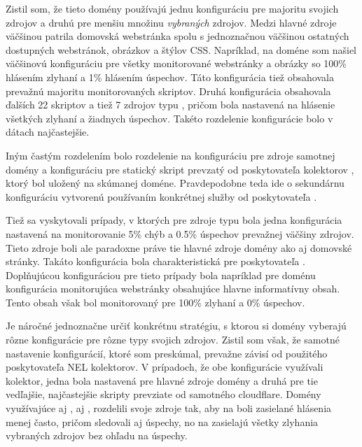 Zistil som, že tieto domény používajú jednu konfiguráciu pre majoritu svojich zdrojov a druhú pre menšiu množinu \textit{vybraných} zdrojov.
Medzi hlavné zdroje väčšinou patrila domovská webstránka spolu s jednoznačnou väčšinou ostatných dostupných webstránok, obrázkov a štýlov CSS.
Napríklad, na doméne  som našiel väčšinovú konfiguráciu pre všetky monitorované webstránky a obrázky so 100\% hlásením zlyhaní a 1\% hlásením úspechov. 
Táto konfigurácia tiež obsahovala prevažnú majoritu monitorovaných skriptov.
Druhá konfigurácia obsahovala ďalších 22 skriptov a tiež 7 zdrojov typu ,
pričom bola nastavená na hlásenie všetkých zlyhaní a žiadnych úspechov.
Takéto rozdelenie konfigurácie bolo v dátach najčastejšie.

Iným častým rozdelením bolo rozdelenie na konfiguráciu pre zdroje samotnej domény a konfiguráciu pre statický skript prevzatý od poskytovateľa kolektorov , ktorý bol uložený na skúmanej doméne.
Pravdepodobne teda ide o sekundárnu konfiguráciu vytvorenú používaním konkrétnej služby od poskytovateľa .

Tiež sa vyskytovali prípady, v ktorých pre zdroje typu  bola jedna konfigurácia nastavená na monitorovanie 5\% chýb a 0.5\% úspechov prevažnej väčšiny zdrojov.
Tieto zdroje boli ale paradoxne práve tie hlavné zdroje domény ako aj domovské stránky.
Takáto konfigurácia bola charakteristická pre poskytovateľa .
Doplňujúcou konfiguráciou pre tieto prípady bola napríklad pre doménu  konfigurácia monitorujúca webstránky obsahujúce hlavne informatívny obsah.
Tento obsah však bol monitorovaný pre 100\% zlyhaní a 0\% úspechov.

Je náročné jednoznačne určiť konkrétnu stratégiu, s ktorou si domény vyberajú rôzne konfigurácie pre rôzne typy svojich zdrojov.
Zistil som však, že samotné nastavenie konfigurácií, ktoré som preskúmal, prevažne závisí od použitého poskytovateľa NEL kolektorov.
V prípadoch, že obe konfigurácie využívali  kolektor, jedna bola nastavená pre hlavné zdroje domény a druhá pre tie vedľajšie, najčastejšie skripty prevziate od samotného cloudflare.
Domény využívajúce aj , aj , rozdelili svoje zdroje tak, aby na  boli zasielané hlásenia menej často, pričom sledovali aj úspechy, no na  zasielajú všetky zlyhania vybraných zdrojov bez ohľadu na úspechy. 




